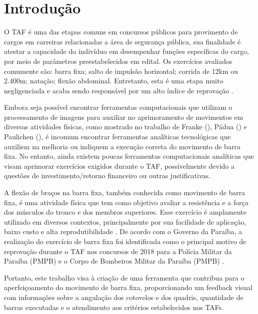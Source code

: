 \chapter{Introdução}



O \ac{TAF} é uma das etapas comuns em concursos públicos para provimento de cargos em carreiras relacionadas a área de segurança pública, sua finalidade é atestar a capacidade do indivíduo em desempenhar funções específicas do cargo, por meio de parâmetros preestabelecidos em edital. Os exercícios avaliados comumente são: barra fixa; salto de impulsão horizontal; corrida de 12km ou 2.400m; natação; flexão abdominal. Entretanto, esta é uma etapa muito negligenciada e acaba sendo responsável por um alto índice de reprovação \cite{reprovaTAF}.


Embora seja possível encontrar ferramentas computacionais que utilizam o processamento de imagens para auxiliar no aprimoramento de movimentos em diversas atividades físicas, como mostrado no trabalho de Franke (\citeyear{vcBicicleta}), Pádua (\citeyear{vcFutebol}) e Paulichen (\citeyear{futebolTatica}), é incomum encontrar ferramentas analíticas tecnológicas que auxiliem na melhoria ou indiquem a execução correta do movimento de barra fixa. No entanto, ainda existem poucas ferramentas computacionais analíticas que visam aprimorar exercícios exigidos durante o \ac{TAF}, possivelmente devido a questões de investimento/retorno financeiro ou outras justificativas.


A flexão de braços na barra fixa, também conhecida como movimento de barra fixa, é uma atividade física que tem como objetivo avaliar a resistência e a força dos músculos do tronco e dos membros superiores. Esse exercício é amplamente utilizado em diversos contextos, principalmente por sua facilidade de aplicação, baixo custo e alta reprodutibilidade \cite{barraFixa}. De acordo com o Governo da Paraíba, a realização do exercício de barra fixa foi identificada como o principal motivo de reprovação durante o \ac{TAF} nos concursos de 2018 para a Polícia Militar da Paraíba (PMPB) e o Corpo de Bombeiros Militar da Paraíba (PMPB) \cite{barraTAF}.



Portanto, este trabalho visa à criação de uma ferramenta que contribua para o aperfeiçoamento do movimento de barra fixa, proporcionando um feedback visual com informações sobre a angulação dos cotovelos e dos quadris, quantidade de barras executadas e o atendimento aos critérios estabelecidos nos \ac{TAF}s.